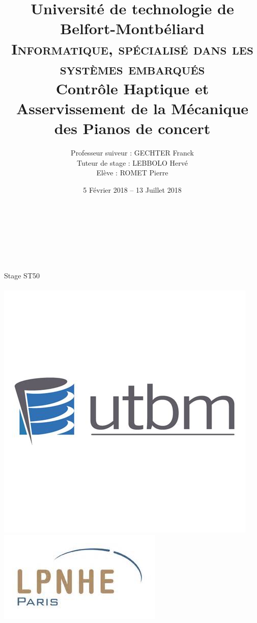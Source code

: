 \documentclass[french,a4paper,12pt]{report}
\begin{document}
\title{	Université de technologie de Belfort-Montbéliard \\
		{\large \textsc{Informatique, spécialisé dans les systèmes embarqués }} \\
		\vspace{1cm}
		Contrôle Haptique et Asservissement de la Mécanique des Pianos de concert
	  }
	  
\date{5 Février 2018 -- 13 Juillet 2018 }
	  
\author{Professeur suiveur : GECHTER Franck  \\
		Tuteur de stage		: LEBBOLO Hervé  \\
		Elève				: ROMET Pierre
		}

\makeatletter
  \begin{titlepage}
  \centering
  \
      {\large \textsc{ }}\\
      \textsc{}\\
      
      \vfill
       {\LARGE \textbf{\@title}} \\
    	\vspace{2em}     
      
    \vspace{1cm}
      {\large{	\@date\\
    \vspace{1cm}
       Stage ST50}}\\
    \vspace{1cm}
        {\large \@author} \\
    \vfill
        \includegraphics[height=0.13\textheight]{UTBM_LOGO.png}
        \hfill
        \includegraphics[height=0.09\textheight]{LPNHE_LOGO.png}
  \end{titlepage}
\end{document}
